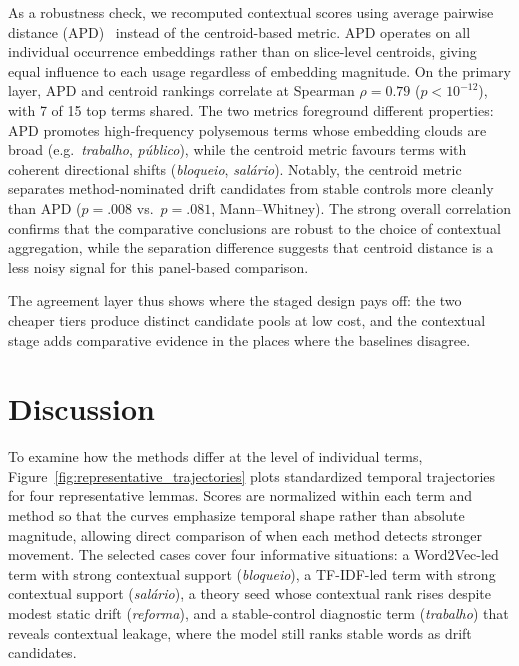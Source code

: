 \documentclass[12pt]{article}
\begin{document}
As a robustness check, we recomputed contextual scores using average pairwise
distance (APD)~\cite{giulianelli-etal-2020-analysing} instead of the centroid-based
metric. APD operates on all individual occurrence embeddings rather than on
slice-level centroids, giving equal influence to each usage regardless of
embedding magnitude. On the primary layer, APD and centroid rankings
correlate at Spearman $\rho = 0.79$ ($p < 10^{-12}$), with 7 of 15 top terms
shared. The two metrics foreground different properties: APD promotes
high-frequency polysemous terms whose embedding clouds are broad (e.g.\
\textit{trabalho}, \textit{p\'ublico}), while the centroid metric favours
terms with coherent directional shifts (\textit{bloqueio},
\textit{sal\'ario}). Notably, the centroid metric separates method-nominated
drift candidates from stable controls more cleanly than APD ($p = .008$ vs.\
$p = .081$, Mann--Whitney). The strong overall correlation confirms that the
comparative conclusions are robust to the choice of contextual aggregation,
while the separation difference suggests that centroid distance is a less
noisy signal for this panel-based comparison.

The agreement layer thus shows where the staged design pays off: the two cheaper tiers produce distinct candidate pools at low cost, and the contextual stage adds comparative evidence in the places where the baselines disagree.

\section{Discussion}
\label{sec:discussion}

To examine how the methods differ at the level of individual terms,
Figure~\ref{fig:representative_trajectories} plots standardized temporal
trajectories for four representative lemmas. Scores are normalized within each
term and method so that the curves emphasize temporal shape rather than absolute
magnitude, allowing direct comparison of when each method detects stronger
movement. The selected cases cover four informative situations:
a Word2Vec-led term with strong contextual support
(\textit{bloqueio}), a TF-IDF-led term with strong contextual support
(\textit{sal\'ario}), a theory seed whose contextual rank rises despite modest
static drift (\textit{reforma}), and a stable-control diagnostic term
(\textit{trabalho}) that reveals contextual leakage, where the model still ranks stable words as drift candidates.
\end{document}
